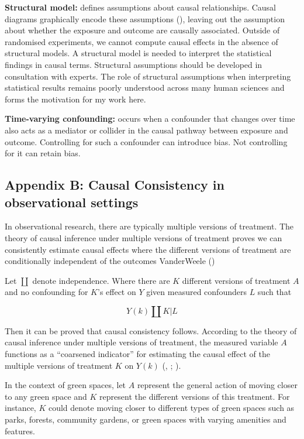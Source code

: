 \documentclass[
  singlecolumn]{article}
\begin{document}
\textbf{Structural model:} defines assumptions about causal
relationships. Causal diagrams graphically encode these assumptions
(), leaving out the
assumption about whether the exposure and outcome are causally
associated. Outside of randomised experiments, we cannot compute causal
effects in the absence of structural models. A structural model is
needed to interpret the statistical findings in causal terms. Structural
assumptions should be developed in consultation with experts. The role
of structural assumptions when interpreting statistical results remains
poorly understood across many human sciences and forms the motivation
for my work here.

\textbf{Time-varying confounding:} occurs when a confounder that changes
over time also acts as a mediator or collider in the causal pathway
between exposure and outcome. Controlling for such a confounder can
introduce bias. Not controlling for it can retain bias.

\subsection{Appendix B: Causal Consistency in observational
settings}\label{appendix-b-causal-consistency-in-observational-settings}

In observational research, there are typically multiple versions of
treatment. The theory of causal inference under multiple versions of
treatment proves we can consistently estimate causal effects where the
different versions of treatment are conditionally independent of the
outcomes VanderWeele ()

Let \(\coprod\) denote independence. Where there are \(K\) different
versions of treatment \(A\) and no confounding for \(K\)'s effect on
\(Y\) given measured confounders \(L\) such that

\[
Y(k) \coprod K | L
\]

Then it can be proved that causal consistency follows. According to the
theory of causal inference under multiple versions of treatment, the
measured variable \(A\) functions as a ``coarsened indicator'' for
estimating the causal effect of the multiple versions of treatment \(K\)
on \(Y(k)\) (,
;
).

In the context of green spaces, let \(A\) represent the general action
of moving closer to any green space and \(K\) represent the different
versions of this treatment. For instance, \(K\) could denote moving
closer to different types of green spaces such as parks, forests,
community gardens, or green spaces with varying amenities and features.
\end{document}
